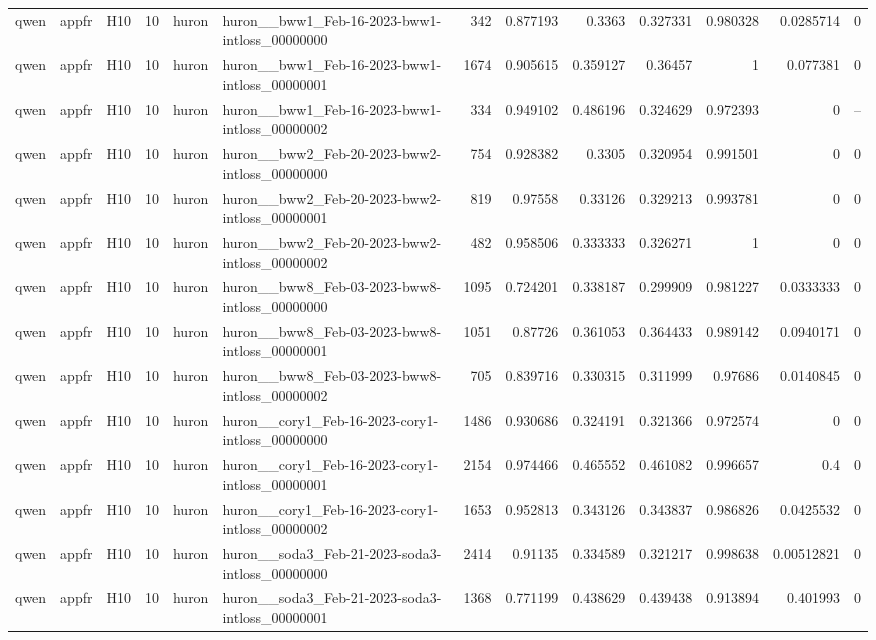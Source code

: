 \begin{longtable}{lllrllrrrrrrr}
qwen & appfr & H10 & 10 & huron & huron\_\_bww1\_Feb-16-2023-bww1-intloss\_00000000 & 342 & 0.877193 & 0.3363 & 0.327331 & 0.980328 & 0.0285714 & 0 \\
qwen & appfr & H10 & 10 & huron & huron\_\_bww1\_Feb-16-2023-bww1-intloss\_00000001 & 1674 & 0.905615 & 0.359127 & 0.36457 & 1 & 0.077381 & 0 \\
qwen & appfr & H10 & 10 & huron & huron\_\_bww1\_Feb-16-2023-bww1-intloss\_00000002 & 334 & 0.949102 & 0.486196 & 0.324629 & 0.972393 & 0 & -- \\
qwen & appfr & H10 & 10 & huron & huron\_\_bww2\_Feb-20-2023-bww2-intloss\_00000000 & 754 & 0.928382 & 0.3305 & 0.320954 & 0.991501 & 0 & 0 \\
qwen & appfr & H10 & 10 & huron & huron\_\_bww2\_Feb-20-2023-bww2-intloss\_00000001 & 819 & 0.97558 & 0.33126 & 0.329213 & 0.993781 & 0 & 0 \\
qwen & appfr & H10 & 10 & huron & huron\_\_bww2\_Feb-20-2023-bww2-intloss\_00000002 & 482 & 0.958506 & 0.333333 & 0.326271 & 1 & 0 & 0 \\
qwen & appfr & H10 & 10 & huron & huron\_\_bww8\_Feb-03-2023-bww8-intloss\_00000000 & 1095 & 0.724201 & 0.338187 & 0.299909 & 0.981227 & 0.0333333 & 0 \\
qwen & appfr & H10 & 10 & huron & huron\_\_bww8\_Feb-03-2023-bww8-intloss\_00000001 & 1051 & 0.87726 & 0.361053 & 0.364433 & 0.989142 & 0.0940171 & 0 \\
qwen & appfr & H10 & 10 & huron & huron\_\_bww8\_Feb-03-2023-bww8-intloss\_00000002 & 705 & 0.839716 & 0.330315 & 0.311999 & 0.97686 & 0.0140845 & 0 \\
qwen & appfr & H10 & 10 & huron & huron\_\_cory1\_Feb-16-2023-cory1-intloss\_00000000 & 1486 & 0.930686 & 0.324191 & 0.321366 & 0.972574 & 0 & 0 \\
qwen & appfr & H10 & 10 & huron & huron\_\_cory1\_Feb-16-2023-cory1-intloss\_00000001 & 2154 & 0.974466 & 0.465552 & 0.461082 & 0.996657 & 0.4 & 0 \\
qwen & appfr & H10 & 10 & huron & huron\_\_cory1\_Feb-16-2023-cory1-intloss\_00000002 & 1653 & 0.952813 & 0.343126 & 0.343837 & 0.986826 & 0.0425532 & 0 \\
qwen & appfr & H10 & 10 & huron & huron\_\_soda3\_Feb-21-2023-soda3-intloss\_00000000 & 2414 & 0.91135 & 0.334589 & 0.321217 & 0.998638 & 0.00512821 & 0 \\
qwen & appfr & H10 & 10 & huron & huron\_\_soda3\_Feb-21-2023-soda3-intloss\_00000001 & 1368 & 0.771199 & 0.438629 & 0.439438 & 0.913894 & 0.401993 & 0 \\

\end{longtable}
